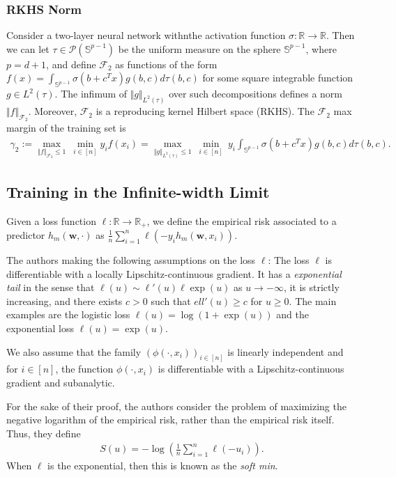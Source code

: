 \documentclass{article}
\begin{document}
\subsubsection{RKHS Norm}
Consider a two-layer neural network withnthe activation function $\sigma: \mathbb{R} \rightarrow \mathbb{R}$. Then we can let $\tau \in \mathcal{P}(\mathbb{S}^{p-1})$ be the uniform measure on the sphere $\mathbb{S}^{p-1}$, where $p=d+1$, and define $\mathcal{F}_2$ as functions of the form $f(x) = \int_{\mathbb{S}^{p-1}} \sigma(b + c^Tx)g(b, c) d\tau(b, c)$ for some square integrable function $g \in L^2(\tau)$. The infimum of $\Vert g \Vert_{L^2(\tau)}$ over such decompositions defines a norm $\Vert f \Vert_{\mathcal{F}_2}$. Moreover, $\mathcal{F}_2$ is a reproducing kernel Hilbert space (RKHS). The $\mathcal{F}_2$ max margin of the training set is
\begin{align*}
    \gamma_2 :=  \underset{\Vert f \Vert_{\mathcal{F}_2} \leq 1}{\max} \ \underset{i \in [n]}{\min} y_i f(x_i)  = \underset{\Vert g \Vert_{L^2(\tau)} \leq 1}{\max} \ \underset{i \in [n]}{\min} \ y_i \int_{\mathbb{S}^{p-1}} \sigma(b + c^Tx)g(b, c) d\tau(b, c).
\end{align*}

\subsection{Training in the Infinite-width Limit}
Given a loss function $\ell: \mathbb{R} \rightarrow \mathbb{R}_+$, we define the empirical risk associated to a predictor $h_m(\boldsymbol{w}, \cdot)$ as $\frac{1}{n}\sum_{i=1}^n \ell(-y_i h_m(\boldsymbol{w}, x_i))$.

The authors making the following assumptions on the loss $\ell$: The loss $\ell$ is differentiable with a locally Lipschitz-continuous gradient. It has a \textit{exponential tail} in the sense that $\ell(u) \sim \ell'(u) \ell \exp(u)$ as $u \rightarrow -\infty$, it is strictly increasing, and there exists $c > 0$ such that $ell'(u) \geq c$ for $u \geq 0$. The main examples are the logistic loss $\ell(u) = \log(1+ \exp(u))$ and the exponential loss $\ell(u) = \exp(u)$.

We also assume that the family $(\phi(\cdot, x_i))_{i \in [n]}$ is linearly independent and for $i \in [n]$, the function $\phi(\cdot, x_i)$ is differentiable with a Lipschitz-continuous gradient and subanalytic.

For the sake of their proof, the authors consider the problem of maximizing the negative logarithm of the empirical risk, rather than the empirical risk itself. Thus, they define 
\begin{align*}
    S(u) = - \log \left( \frac{1}{n} \sum_{i=1}^n \ell(-u_i) \right).
\end{align*}
When $\ell$ is the exponential, then this is known as the \textit{soft min}.
\end{document}
